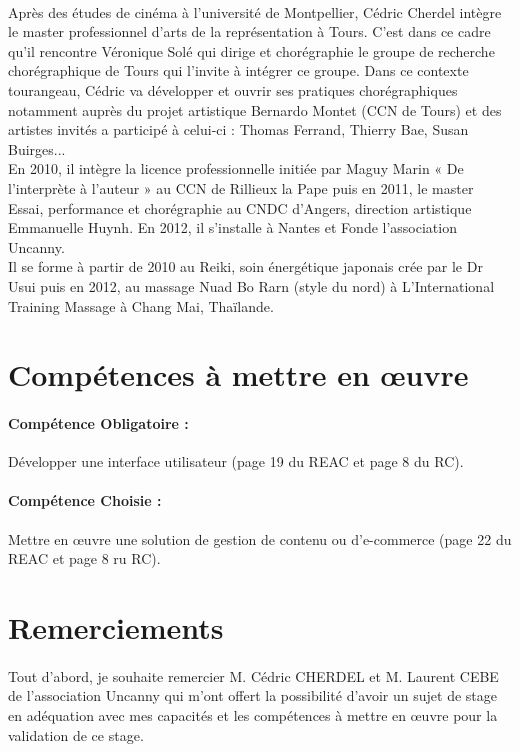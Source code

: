 \documentclass[11pt,a4paper]{report}
\begin{document}
		\paragraph*{}Après des études de cinéma à l'université de Montpellier, Cédric Cherdel intègre le master professionnel d'arts de la représentation à Tours. C'est dans ce cadre qu'il rencontre Véronique Solé qui dirige et chorégraphie le groupe de recherche chorégraphique de Tours qui l'invite à intégrer ce groupe. Dans ce contexte tourangeau, Cédric va développer et ouvrir ses pratiques chorégraphiques notamment auprès du projet artistique Bernardo Montet (CCN de Tours) et des artistes invités a participé à celui-ci : Thomas Ferrand, Thierry Bae, Susan Buirges...\\
		En 2010, il intègre la licence professionnelle initiée par Maguy Marin « De l'interprète à l'auteur » au CCN de Rillieux la Pape puis en 2011, le master Essai, performance et chorégraphie au CNDC d'Angers, direction artistique Emmanuelle Huynh. En 2012, il s'installe à Nantes et Fonde l'association Uncanny.\\
		Il se forme à partir de 2010 au Reiki, soin énergétique japonais crée par le Dr Usui puis en 2012, au massage Nuad Bo Rarn (style du nord) à L'International Training Massage à Chang Mai, Thaïlande.
	\section{Compétences à mettre en œuvre}
		\paragraph*{\indent Compétence Obligatoire :} Développer une interface utilisateur (page 19 du REAC et page 8 du RC).
		\paragraph*{\indent Compétence Choisie :} Mettre en œuvre une solution de gestion de contenu ou d’e-commerce (page 22 du REAC et page 8 ru RC).
		\newpage
	\section{Remerciements}
		\paragraph*{}Tout d'abord, je souhaite  remercier M. Cédric CHERDEL et M. Laurent CEBE de l'association Uncanny qui m'ont offert la possibilité d'avoir un sujet de stage en adéquation avec mes capacités et les compétences à mettre en œuvre pour la validation de ce stage.
\end{document}
